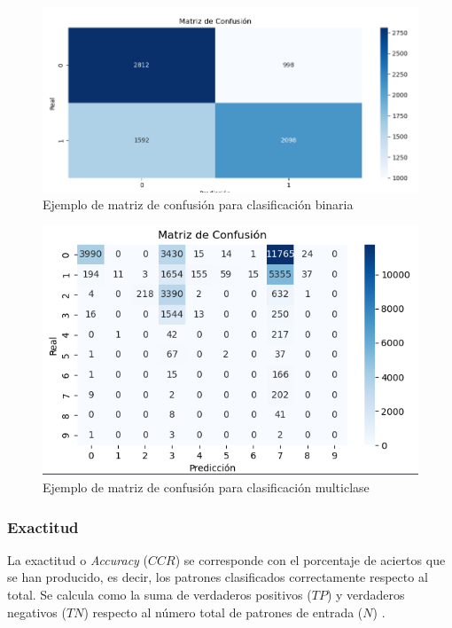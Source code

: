 \begin{figure}[H]
	\centering
	\includegraphics[width=1\linewidth]{Imagenes/confusion_binaria_ejemplo}
	\caption[Ejemplo de matriz de confusión para clasificación binaria]{Ejemplo de matriz de confusión para clasificación binaria}
	\label{fig:confmat_bin}
\end{figure}

\begin{figure}[H]
	\centering
	\includegraphics[width=1\linewidth]{Imagenes/confusion_multi_ejemplo}
	\caption[Ejemplo de matriz de confusión para clasificación multiclase]{Ejemplo de matriz de confusión para clasificación multiclase}
	\label{fig:confmat_multi}
\end{figure}

\subsubsection{Exactitud}
\label{subsubsec:acc}

La exactitud o \textit{Accuracy} ($CCR$) se corresponde con el porcentaje de aciertos que se han producido, es decir, los patrones clasificados correctamente respecto al total. Se calcula como la suma de verdaderos positivos ($TP$) y verdaderos negativos ($TN$) respecto al número total de patrones de entrada ($N$) \cite{metrics}.

